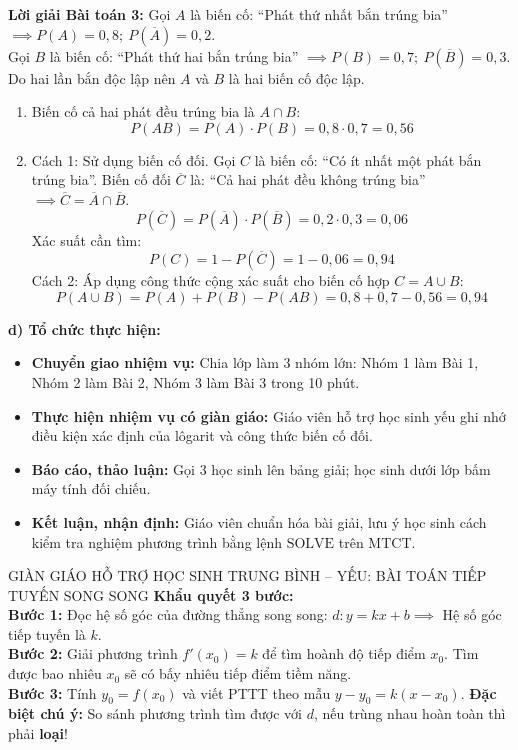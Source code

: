 \documentclass[12pt, a4paper]{article}
\begin{document}
\textbf{Lời giải Bài toán 3:}
Gọi $A$ là biến cố: ``Phát thứ nhất bắn trúng bia'' $\implies P(A) = 0{,}8; \ P(\overline{A}) = 0{,}2$.\\
Gọi $B$ là biến cố: ``Phát thứ hai bắn trúng bia'' $\implies P(B) = 0{,}7; \ P(\overline{B}) = 0{,}3$.\\
Do hai lần bắn độc lập nên $A$ và $B$ là hai biến cố độc lập.
\begin{enumerate}[label=\alph*)]
    \item Biến cố cả hai phát đều trúng bia là $A \cap B$:
    $$P(AB) = P(A) \cdot P(B) = 0{,}8 \cdot 0{,}7 = 0{,}56$$

    \item Cách 1: Sử dụng biến cố đối.
    Gọi $C$ là biến cố: ``Có ít nhất một phát bắn trúng bia''.
    Biến cố đối $\overline{C}$ là: ``Cả hai phát đều không trúng bia'' $\implies \overline{C} = \overline{A} \cap \overline{B}$.
    $$P(\overline{C}) = P(\overline{A}) \cdot P(\overline{B}) = 0{,}2 \cdot 0{,}3 = 0{,}06$$
    Xác suất cần tìm:
    $$P(C) = 1 - P(\overline{C}) = 1 - 0{,}06 = 0{,}94$$
    Cách 2: Áp dụng công thức cộng xác suất cho biến cố hợp $C = A \cup B$:
    $$P(A \cup B) = P(A) + P(B) - P(AB) = 0{,}8 + 0{,}7 - 0{,}56 = 0{,}94$$
\end{enumerate}

\noindent \textbf{d) Tổ chức thực hiện:}
\begin{itemize}[leftmargin=0.6cm]
    \item \textbf{Chuyển giao nhiệm vụ:} Chia lớp làm 3 nhóm lớn: Nhóm 1 làm Bài 1, Nhóm 2 làm Bài 2, Nhóm 3 làm Bài 3 trong 10 phút.
    \item \textbf{Thực hiện nhiệm vụ có giàn giáo:} Giáo viên hỗ trợ học sinh yếu ghi nhớ điều kiện xác định của lôgarit và công thức biến cố đối.
    \item \textbf{Báo cáo, thảo luận:} Gọi 3 học sinh lên bảng giải; học sinh dưới lớp bấm máy tính đối chiếu.
    \item \textbf{Kết luận, nhận định:} Giáo viên chuẩn hóa bài giải, lưu ý học sinh cách kiểm tra nghiệm phương trình bằng lệnh $\text{SOLVE}$ trên MTCT.
\end{itemize}

\begin{scaffoldbox}{GIÀN GIÁO HỖ TRỢ HỌC SINH TRUNG BÌNH -- YẾU: BÀI TOÁN TIẾP TUYẾN SONG SONG}
\textbf{Khẩu quyết 3 bước:}\\
\textbf{Bước 1:} Đọc hệ số góc của đường thẳng song song: $d: y = kx + b \implies$ Hệ số góc tiếp tuyến là $k$.\\
\textbf{Bước 2:} Giải phương trình $f'(x_0) = k$ để tìm hoành độ tiếp điểm $x_0$. Tìm được bao nhiêu $x_0$ sẽ có bấy nhiêu tiếp điểm tiềm năng.\\
\textbf{Bước 3:} Tính $y_0 = f(x_0)$ và viết PTTT theo mẫu $y - y_0 = k(x - x_0)$. \textbf{Đặc biệt chú ý:} So sánh phương trình tìm được với $d$, nếu trùng nhau hoàn toàn thì phải \textbf{loại}!
\end{scaffoldbox}
\end{document}
